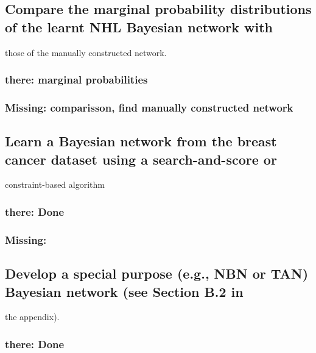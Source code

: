 \documentclass[]{article}
\begin{document}
\subsection{Compare the marginal probability distributions of the learnt
NHL Bayesian network
with}\label{compare-the-marginal-probability-distributions-of-the-learnt-nhl-bayesian-network-with}

those of the manually constructed network.

\subsubsection{there: marginal
probabilities}\label{there-marginal-probabilities}

\subsubsection{Missing: comparisson, find manually constructed
network}\label{missing-comparisson-find-manually-constructed-network}

\subsection{Learn a Bayesian network from the breast cancer dataset
using a search-and-score
or}\label{learn-a-bayesian-network-from-the-breast-cancer-dataset-using-a-search-and-score-or}

constraint-based algorithm

\subsubsection{there: Done}\label{there-done}

\subsubsection{Missing:}\label{missing}

\subsection{Develop a special purpose (e.g., NBN or TAN) Bayesian
network (see Section B.2
in}\label{develop-a-special-purpose-e.g.-nbn-or-tan-bayesian-network-see-section-b.2-in}

the appendix).

\subsubsection{there: Done}\label{there-done-1}
\end{document}

